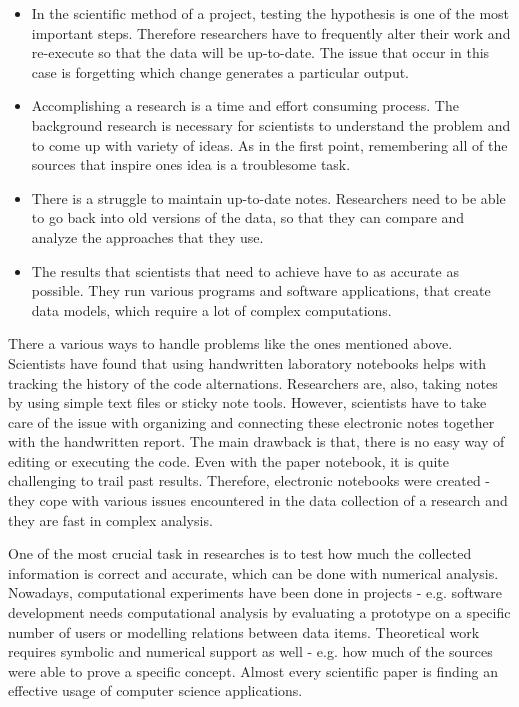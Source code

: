 \begin{itemize}
\item In the scientific method of a project, testing the hypothesis is one of the most important steps. Therefore researchers have to frequently alter their work and re-execute so that the data will be up-to-date. The issue that occur in this case is forgetting which change generates a particular output. 

\item Accomplishing a research is a time and effort consuming process. The background research is necessary for scientists to understand the problem and to come up with variety of ideas. As in the first point, remembering all of the sources that inspire ones idea is a troublesome task. 

\item There is a struggle to maintain up-to-date notes. Researchers need to be able to go back into old versions of the data, so that they can compare and analyze the approaches that they use. 

\item The results that scientists that need to achieve have to as accurate as possible. They run various programs and software applications, that create data models, which require a lot of complex computations.

\end{itemize}

There a various ways to handle problems like the ones mentioned above. Scientists have found that using handwritten laboratory notebooks helps with tracking the history of the code alternations. Researchers are, also, taking notes by using simple text files or sticky note tools. However, scientists have to take care of the issue with organizing and connecting these electronic notes together with the handwritten report. The main drawback is that, there is no easy way of editing or executing the code. Even with the paper notebook, it is quite challenging to trail past results. Therefore, electronic notebooks were created - they cope with various issues encountered in the data collection of a research and they are fast in complex analysis.

One of the most crucial task in researches is to test how much the collected information is correct and accurate, which can be done with numerical analysis. Nowadays, computational experiments have been done in projects - e.g. software development needs computational analysis by evaluating a prototype on a specific number of users or modelling relations between data items. Theoretical work requires symbolic and numerical support as well - e.g. how much of the sources were able to prove a specific concept. Almost every scientific paper is finding an effective usage of computer science applications.

